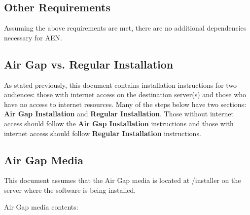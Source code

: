 \documentclass[letterpaper,10pt,openany,oneside]{sphinxmanual}
\begin{document}
\subsection{Other Requirements}
\label{AnacondaEnterpriseNotebooks:other-requirements}
Assuming the above requirements are met, there are no additional
dependencies necessary for AEN.


\subsection{Air Gap vs. Regular Installation}
\label{AnacondaEnterpriseNotebooks:air-gap-vs-regular-installation}
As stated previously, this document contains installation instructions
for two audiences: those with internet access on the destination
server(s) and those who have no access to internet resources. Many of
the steps below have two sections: \textbf{Air Gap Installation} and
\textbf{Regular Installation}. Those without internet access should follow
the \textbf{Air Gap Installation} instructions and those with internet access
should follow \textbf{Regular Installation} instructions.


\subsection{Air Gap Media}
\label{AnacondaEnterpriseNotebooks:air-gap-media}
This document assumes that the Air Gap media is located at /installer on
the server where the software is being installed.

Air Gap media contents:
\end{document}
